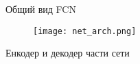 
\begin{frame}{Общий вид FCN}
\begin{figure}
\centering
\texttt{[image: net\_arch.png]}
\end{figure}
    Енкодер и декодер части сети
\end{frame}